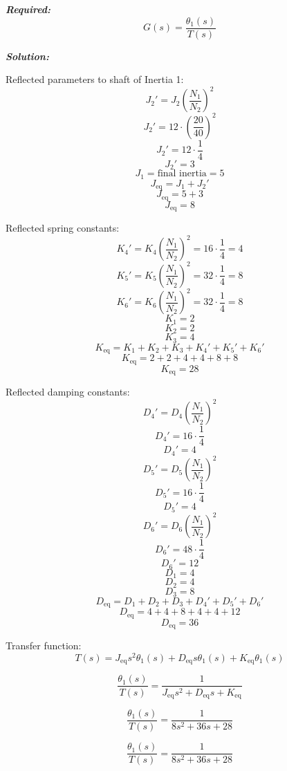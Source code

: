 ﻿\documentclass[11pt]{article}
\begin{document}
\vspace{12pt}

\noindent \textbf{\textit{Required:}}
\[
G(s) = \frac{\theta_1(s)}{T(s)}
\]

\vspace{12pt}


\noindent\textbf{\textit{Solution:}}

Reflected parameters to shaft of Inertia 1:
\[
J_2' = J_2 \left( \frac{N_1}{N_2} \right)^2 
\]
\[
J_2' = 12 \cdot \left( \frac{20}{40} \right)^2 
\]
\[
J_2' = 12 \cdot \frac{1}{4} 
\]
\[
J_2' = 3
\]
\[
J_1 = \text{final inertia} = 5
\]
\[
J_{\text{eq}} = J_1 + J_2' 
\]
\[
J_{\text{eq}} = 5 + 3 
\]
\[
J_{\text{eq}} = 8
\]

Reflected spring constants:
\[
K_4' = K_4 \left( \frac{N_1}{N_2} \right)^2 = 16 \cdot \frac{1}{4} = 4
\]
\[
K_5' = K_5 \left( \frac{N_1}{N_2} \right)^2 = 32 \cdot \frac{1}{4} = 8
\]
\[
K_6' = K_6 \left( \frac{N_1}{N_2} \right)^2 = 32 \cdot \frac{1}{4} = 8
\]
\[
K_1 = 2
\]
\[
K_2 = 2
\]
\[
K_3 = 4
\]
\[
K_{\text{eq}} = K_1 + K_2 + K_3 + K_4' + K_5' + K_6' 
\]
\[
K_{\text{eq}} = 2 + 2 + 4 + 4 + 8 + 8 
\]
\[
K_{\text{eq}} = 28
\]

Reflected damping constants:
\[
D_4' = D_4 \left( \frac{N_1}{N_2} \right)^2 
\]
\[
D_4' = 16 \cdot \frac{1}{4} 
\]
\[
D_4' = 4
\]
\[
D_5' = D_5 \left( \frac{N_1}{N_2} \right)^2 
\]
\[
D_5' = 16 \cdot \frac{1}{4} 
\]
\[
D_5' = 4
\]
\[
D_6' = D_6 \left( \frac{N_1}{N_2} \right)^2 
\]
\[
D_6' = 48 \cdot \frac{1}{4} 
\]
\[
D_6' = 12
\]
\[
D_1 = 4
\]
\[
D_2 = 4
\]
\[
D_3 = 8
\]
\[
D_{\text{eq}} = D_1 + D_2 + D_3 + D_4' + D_5' + D_6' 
\]
\[
D_{\text{eq}} = 4 + 4 + 8 + 4 + 4 + 12 
\]
\[
D_{\text{eq}} = 36
\]

Transfer function:
\[
T(s) = J_{\text{eq}} s^2 \theta_1(s) + D_{\text{eq}} s \theta_1(s) + K_{\text{eq}} \theta_1(s)
\]

\[
\frac{\theta_1(s)}{T(s)} = \frac{1}{J_{\text{eq}} s^2 + D_{\text{eq}} s + K_{\text{eq}}}
\]

\[
\frac{\theta_1(s)}{T(s)} = \frac{1}{8 s^2 + 36 s + 28}
\]

\[
\boxed{\frac{\theta_1(s)}{T(s)} = \frac{1}{8 s^2 + 36 s + 28}}
\]


\end{document}
